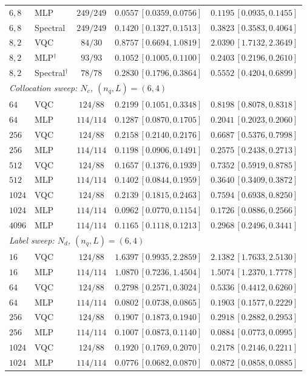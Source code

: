\documentclass[11pt]{article}
\begin{document}
\begin{table}[!htbp]
\begin{tabular}{llcll}
$6,8$ & MLP & $249/249$ & $0.0557\,[0.0359,0.0756]$ & $0.1195\,[0.0935,0.1455]$ \\
$6,8$ & Spectral & $249/249$ & $0.1420\,[0.1327,0.1513]$ & $0.3823\,[0.3583,0.4064]$ \\
$8,2$ & VQC & $84/30$ & $0.8757\,[0.6694,1.0819]$ & $2.0390\,[1.7132,2.3649]$ \\
$8,2$ & MLP$^{\dagger}$ & $93/93$ & $0.1052\,[0.1005,0.1100]$ & $0.2403\,[0.2196,0.2610]$ \\
$8,2$ & Spectral$^{\dagger}$ & $78/78$ & $0.2830\,[0.1796,0.3864]$ & $0.5552\,[0.4204,0.6899]$ \\
\midrule\multicolumn{5}{l}{\textit{Collocation sweep: $N_c$, $(n_q,L)=(6,4)$}}\\
$64$ & VQC & $124/88$ & $0.2199\,[0.1051,0.3348]$ & $0.8198\,[0.8078,0.8318]$ \\
$64$ & MLP & $114/114$ & $0.1287\,[0.0870,0.1705]$ & $0.2041\,[0.2023,0.2060]$ \\
$256$ & VQC & $124/88$ & $0.2158\,[0.2140,0.2176]$ & $0.6687\,[0.5376,0.7998]$ \\
$256$ & MLP & $114/114$ & $0.1198\,[0.0906,0.1491]$ & $0.2575\,[0.2438,0.2713]$ \\
$512$ & VQC & $124/88$ & $0.1657\,[0.1376,0.1939]$ & $0.7352\,[0.5919,0.8785]$ \\
$512$ & MLP & $114/114$ & $0.1402\,[0.0844,0.1959]$ & $0.3640\,[0.3409,0.3872]$ \\
$1024$ & VQC & $124/88$ & $0.2139\,[0.1815,0.2463]$ & $0.7594\,[0.6938,0.8250]$ \\
$1024$ & MLP & $114/114$ & $0.0962\,[0.0770,0.1154]$ & $0.1726\,[0.0886,0.2566]$ \\
$4096$ & MLP & $114/114$ & $0.1165\,[0.1118,0.1213]$ & $0.2968\,[0.2496,0.3441]$ \\
\midrule\multicolumn{5}{l}{\textit{Label sweep: $N_d$, $(n_q,L)=(6,4)$}}\\
$16$ & VQC & $124/88$ & $1.6397\,[0.9935,2.2859]$ & $2.1382\,[1.7633,2.5130]$ \\
$16$ & MLP & $114/114$ & $1.0870\,[0.7236,1.4504]$ & $1.5074\,[1.2370,1.7778]$ \\
$64$ & VQC & $124/88$ & $0.2798\,[0.2571,0.3024]$ & $0.5336\,[0.4412,0.6260]$ \\
$64$ & MLP & $114/114$ & $0.0802\,[0.0738,0.0865]$ & $0.1903\,[0.1577,0.2229]$ \\
$256$ & VQC & $124/88$ & $0.1907\,[0.1873,0.1940]$ & $0.2918\,[0.2882,0.2953]$ \\
$256$ & MLP & $114/114$ & $0.1007\,[0.0873,0.1140]$ & $0.0884\,[0.0773,0.0995]$ \\
$1024$ & VQC & $124/88$ & $0.1920\,[0.1769,0.2070]$ & $0.2178\,[0.2146,0.2211]$ \\
$1024$ & MLP & $114/114$ & $0.0776\,[0.0682,0.0870]$ & $0.0872\,[0.0858,0.0885]$ \\
\bottomrule
\end{tabular}
\end{table}
\FloatBarrier
\end{document}
